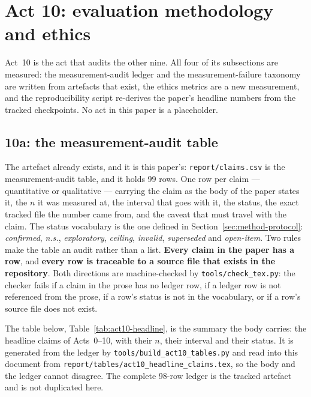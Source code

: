 \documentclass[11pt,a4paper]{article}
\begin{document}
\section{Act 10: evaluation methodology and ethics}
\label{sec:act10}

Act~10 is the act that audits the other nine. All four of its subsections are
measured: the measurement-audit ledger and the measurement-failure taxonomy
are written from artefacts that exist, the ethics metrics are a new
measurement, and the reproducibility script re-derives the paper's headline
numbers from the tracked checkpoints. No act in this paper is a placeholder.

\subsection{10a: the measurement-audit table}
\label{sec:act10a}

The artefact already exists, and it is this paper's: \texttt{report/claims.csv}
is the measurement-audit table, and it holds 99 rows. One row per claim ---
quantitative or qualitative --- carrying the claim as the body of the paper
states it, the $n$ it was measured at, the interval that goes with it, the
status, the exact tracked file the number came from, and the caveat that must
travel with the claim. The status vocabulary is the one defined in
Section~\ref{sec:method-protocol}: \emph{confirmed}, \emph{n.s.},
\emph{exploratory}, \emph{ceiling}, \emph{invalid}, \emph{superseded} and
\emph{open-item}. Two rules make the table an audit rather than a list.
\textbf{Every claim in the paper has a row}, and \textbf{every row is
traceable to a source file that exists in the repository}. Both directions are
machine-checked by \texttt{tools/check\_tex.py}: the checker fails if a claim
in the prose has no ledger row, if a ledger row is not referenced from the
prose, if a row's status is not in the vocabulary, or if a row's source file
does not exist. %

The table below, Table~\ref{tab:act10-headline}, is the summary the body
carries: the headline claims of Acts~0--10, with their $n$, their interval and
their status. It is generated from the ledger by
\texttt{tools/build\_act10\_tables.py} and read into this document from
\texttt{report/tables/\allowbreak act10\_headline\_claims.tex}, so the body and the ledger
cannot disagree. The complete 98-row ledger is the tracked artefact and is
not duplicated here.


\label{tab:act10-headline}
\end{document}
